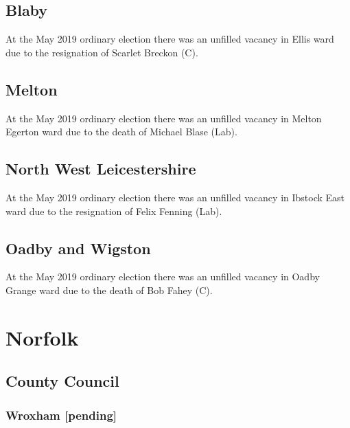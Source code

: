 \documentclass[a4paper,openany]{book}
\begin{document}
\begin{resultsiii}
\subsection*{Blaby}

At the May 2019 ordinary election there was an unfilled vacancy in Ellis ward due to the resignation of Scarlet Breckon (C).

\subsection*{Melton}

At the May 2019 ordinary election there was an unfilled vacancy in Melton Egerton ward due to the death of Michael Blase (Lab).

\subsection*{North West Leicestershire}

At the May 2019 ordinary election there was an unfilled vacancy in Ibstock East ward due to the resignation of Felix Fenning (Lab).

\subsection*{Oadby and Wigston}

At the May 2019 ordinary election there was an unfilled vacancy in Oadby Grange ward due to the death of Bob Fahey (C).

\section{Norfolk}

\subsection*{County Council}

\subsubsection*{Wroxham \hspace*{\fill}\nolinebreak[1]%
	\enspace\hspace*{\fill}
	[pending]}


\end{resultsiii}
\end{document}
